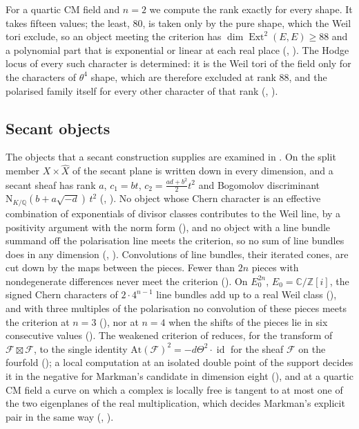 \documentclass[11pt,reqno]{amsart}
\theoremstyle{plain}
\theoremstyle{definition}
\theoremstyle{remark}
\newcommand{\QQ}{\mathbb{Q}}
\newcommand{\ZZ}{\mathbb{Z}}
\newcommand{\CC}{\mathbb{C}}
\newcommand{\cF}{\mathcal{F}}
\newcommand{\Nm}{\mathrm{N}}             %
\DeclareMathOperator{\Ext}{Ext}
\DeclareMathOperator{\id}{id}
\begin{document}
For a quartic CM field and $n=2$ we compute the rank exactly for every
shape. It takes fifteen values; the least, $80$, is taken only by the pure
shape, which the Weil tori exclude, so an object meeting the criterion has
$\dim\Ext^{2}(E,E)\ge88$ and a polynomial part that is exponential or linear
at each real place (, ). The
Hodge locus of every such character is determined: it is the Weil tori of the
field only for the characters of $\theta^{4}$ shape, which are therefore
excluded at rank $88$, and the polarised family itself for every other
character of that rank (, ).

\subsection{Secant objects}

The objects that a secant construction supplies are examined in
. On the split member $X\times\widehat{X}$ of
\cite[Section~14]{paperI} the secant plane is written down in every dimension,
and a secant sheaf has rank $a$, $c_{1}=bt$, $c_{2}=\tfrac{ad+b^{2}}{2}t^{2}$
and Bogomolov discriminant $\Nm_{K/\QQ}(b+a\sqrt{-d})\,t^{2}$
(\cite[Theorem~14.5]{paperI}, \cite[Theorem~14.13]{paperI}). No object whose Chern character
is an effective combination of exponentials of divisor classes contributes to
the Weil line, by a positivity argument with the norm form
(), and no object with a line bundle summand off the
polarisation line meets the criterion, so no sum of line bundles does in any
dimension (\cite[Theorem~9.20]{paperI}, ). Convolutions of line
bundles, their iterated cones, are cut down by the maps between the pieces.
Fewer than $2n$ pieces with nondegenerate differences never meet the
criterion (). On $E_{0}^{2n}$, $E_{0}=\CC/\ZZ[i]$, the
signed Chern characters of $2\cdot4^{n-1}$ line bundles add up to a real
Weil class (), and with three multiples of the
polarisation no convolution of these pieces meets the criterion at $n=3$
(), nor at $n=4$ when the shifts of the pieces lie
in six consecutive values (). The weakened criterion
of \cite[Question~11.4]{Mar25b} reduces, for the transform of
$\cF\boxtimes\cF$, to the single identity
$\mathrm{At}(\cF)^{2}=-d\Theta^{2}\cdot\id$ for the sheaf $\cF$ on the
fourfold (); a local computation at an isolated double point
of the support decides it in the negative for Markman's candidate in
dimension eight (), and at a quartic CM field a
curve on which a complex is locally free is tangent to at most one of the two
eigenplanes of the real multiplication, which decides Markman's explicit pair
\cite[Example~11.2.7]{Mar25c} in the same way (,
).
\end{document}
